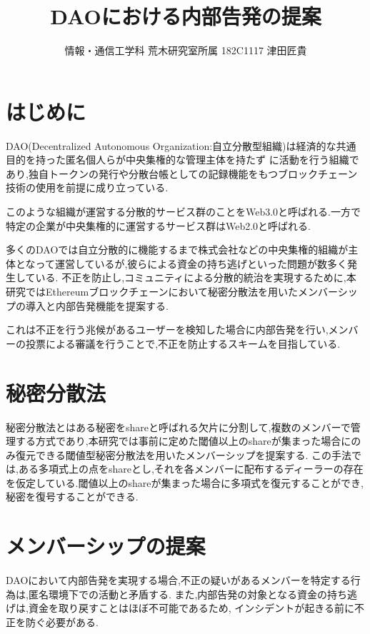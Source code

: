 \documentclass[43pt,twocolumn,a4j]{jarticle}
\title{\normalsize \textbf {DAOにおける内部告発の提案}\vspace{-15pt}}
\author{\normalsize	情報・通信工学科 荒木研究室所属 182C1117 津田匠貴}
\date{\vspace{-20pt}}
\begin{document}
\maketitle

\section{\normalsize はじめに\vspace{-10pt}}
DAO(Decentralized Autonomous Organization:自立分散型組織)は経済的な共通目的を持った匿名個人らが中央集権的な管理主体を持たず
に活動を行う組織であり,独自トークンの発行や分散台帳としての記録機能をもつブロックチェーン技術の使用を前提に成り立っている.

このような組織が運営する分散的サービス群のことをWeb3.0と呼ばれる.一方で特定の企業が中央集権的に運営するサービス群はWeb2.0と呼ばれる.

多くのDAOでは自立分散的に機能するまで株式会社などの中央集権的組織が主体となって運営しているが,彼らによる資金の持ち逃げといった問題が数多く発生している.
不正を防止し,コミュニティによる分散的統治を実現するために,本研究ではEthereumブロックチェーンにおいて秘密分散法を用いたメンバーシップの導入と内部告発機能を提案する.

これは不正を行う兆候があるユーザーを検知した場合に内部告発を行い,メンバーの投票による審議を行うことで,不正を防止するスキームを目指している. \vspace{-20pt}

\section{\normalsize 秘密分散法\vspace{-10pt}}
秘密分散法とはある秘密をshareと呼ばれる欠片に分割して,複数のメンバーで管理する方式であり,本研究では事前に定めた閾値以上のshareが集まった場合にのみ復元できる閾値型秘密分散法を用いたメンバーシップを提案する.
この手法では,ある多項式上の点をshareとし,それを各メンバーに配布するディーラーの存在を仮定している.閾値以上のshareが集まった場合に多項式を復元することができ,秘密を復号することができる.
\vspace{-20pt}

\section{\normalsize メンバーシップの提案\vspace{-10pt}}
DAOにおいて内部告発を実現する場合,不正の疑いがあるメンバーを特定する行為は,匿名環境下での活動と矛盾する.
また,内部告発の対象となる資金の持ち逃げは,資金を取り戻すことはほぼ不可能であるため,
インシデントが起きる前に不正を防ぐ必要がある.
\end{document}
